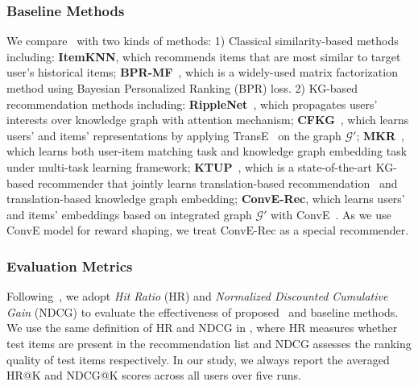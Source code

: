 \subsubsection{Baseline Methods} 
We compare \name\ with two kinds of methods: 
1) Classical similarity-based methods including:  
\textbf{ItemKNN}, which recommends items that are most similar to target user's historical items; 
\textbf{BPR-MF}~\cite{yu2014personalized}, which is a widely-used matrix factorization method using Bayesian Personalized Ranking (BPR) loss. 
2) KG-based recommendation methods including: 
\textbf{RippleNet}~\cite{wang2018ripplenet}, which propagates users' interests over knowledge graph with attention mechanism;  
\textbf{CFKG}~\cite{zhang2018learning}, which learns users' and items' representations by applying TransE~\cite{bordes2013translating} on the graph $\mathcal{G}'$; 
\textbf{MKR}~\cite{Wang_2019}, which learns both user-item matching task and knowledge graph embedding task under multi-task learning framework; 
\textbf{KTUP}~\cite{Cao_2019}, which is a state-of-the-art KG-based recommender that jointly learns translation-based recommendation~\cite{he2017translation} and translation-based knowledge graph embedding;
\textbf{ConvE-Rec}, which learns users' and items' embeddings based on integrated graph $\mathcal{G}'$ with ConvE~\cite{dettmers2018convolutional}. As we use ConvE model for reward shaping, we treat ConvE-Rec as a special recommender.  


\subsubsection{Evaluation Metrics} Following~\cite{Cao_2019,he2015trirank,song2019session}, we adopt \textit{Hit Ratio} (HR) and \textit{Normalized Discounted Cumulative Gain} (NDCG) to evaluate the effectiveness of proposed \name\ and baseline methods. We use the same definition of HR and NDCG in \cite{he2015trirank}, where HR measures whether test items are present in the recommendation list and NDCG assesses the ranking quality of test items respectively.
In our study, we always report the averaged HR@K and NDCG@K scores across all users over five runs.



